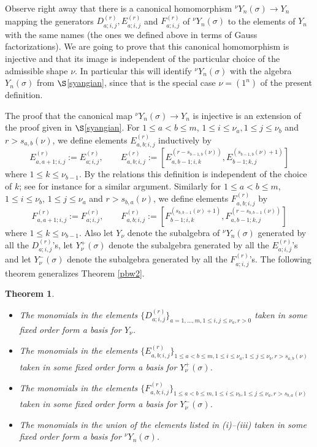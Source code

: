 \documentclass[twoside,12pt,reqno]{amsart}
\newtheorem{Theorem}[Proposition]{Theorem}
\begin{document}
Observe right away that there is a canonical
homomorphism ${^\nu}Y_n(\sigma) \rightarrow Y_n$
mapping the generators $D_{a;i,j}^{(r)}, 
E_{a;i,j}^{(r)}$ and $F_{a;i,j}^{(r)}$ of ${^\nu}Y_n(\sigma)$
to the elements
of $Y_n$  with the same names (the ones we defined above in 
terms of Gauss factorizations).
We are going to prove that this canonical
homomorphism is injective and that its image is independent
of the particular choice of the admissible shape $\nu$.
In particular this will identify ${^\nu}Y_n(\sigma)$ with the
algebra $Y_n(\sigma)$ from $\S$\ref{syangian}, 
since that is the special case $\nu = (1^n)$ of the present definition.

The proof that the canonical map ${^\nu}Y_n(\sigma) \rightarrow Y_n$
is injective is an extension of the proof given in
$\S$\ref{syangian}. For $1 \leq a < b \leq m$,
$1 \leq i \leq \nu_a, 1 \leq j \leq \nu_b$ and
$r > s_{a,b}(\nu)$, we define elements
$E_{a,b;i,j}^{(r)}$ inductively by
\begin{equation}\label{higheres}
E_{a,a+1;i,j}^{(r)} := E_{a;i,j}^{(r)},
\qquad
E_{a,b;i,j}^{(r)} := [E_{a,b-1;i,k}^{(r-s_{b-1,b}(\nu))},
E_{b-1;k,j}^{(s_{b-1,b}(\nu)+1)}]
\end{equation}
where $1 \leq k \leq \nu_{b-1}$.
By the relations
this definition is independent of the choice of $k$;
see for instance \cite[(6.9)]{BK} for a similar argument.
Similarly for $1 \leq a < b \leq m$,
$1 \leq i \leq \nu_b$, $1 \leq j \leq \nu_a$ and 
$r > s_{b,a}(\nu)$, we define
elements $F_{a,b;i,j}^{(r)}$ by
\begin{equation}\label{higherfs}
F_{a,a+1;i,j}^{(r)} := F_{a;i,j}^{(r)},
\qquad
F_{a,b;i,j}^{(r)} := [F_{b-1;i,k}^{(s_{b,b-1}(\nu)+1)},
F_{a,b-1;k,j}^{(r-s_{b,b-1}(\nu))}]
\end{equation}
where $1 \leq k \leq \nu_{b-1}$.
Also let $Y_\nu$ denote the subalgebra of ${^\nu}Y_n(\sigma)$
generated by all the $D_{a;i,j}^{(r)}$'s, let
$Y_\nu^+(\sigma)$ denote the subalgebra generated by all the
$E_{a;i,j}^{(r)}$'s and let
$Y_\nu^-(\sigma)$ denote the subalgebra generated by all the
$F_{a;i,j}^{(r)}$'s.
The following theorem generalizes Theorem \ref{pbw2}.

\begin{Theorem}\label{pbw3}
\begin{itemize}
\item[(i)] The monomials in the elements 
$\{D_{a;i,j}^{(r)}\}_{a=1,\dots,m, 1 \leq i,j \leq \nu_a,r>0}$ 
taken in some
fixed order form a basis for $Y_\nu$.
\item[(ii)] The monomials in the elements 
$\{E_{a,b;i,j}^{(r)}\}_{1 \leq a < b \leq m, 1 \leq i \leq \nu_a, 1 \leq j \leq \nu_b, r >s_{a,b}(\nu)}$ taken in some fixed
order form a basis for $Y_\nu^+(\sigma)$.
\item[(iii)] The monomials in the elements
$\{F_{a,b;i,j}^{(r)}\}_{1 \leq a < b \leq m, 
1 \leq i \leq \nu_b, 1 \leq j \leq \nu_a, r > s_{b,a}(\nu)}$ taken in some fixed
order form a basis for $Y_\nu^-(\sigma)$.
\item[(iv)] The monomials in the union of
the elements listed in (i)--(iii)
taken in some fixed order form a basis for ${^\nu}Y_n(\sigma)$.
\end{itemize}
\end{Theorem}
\end{document}
